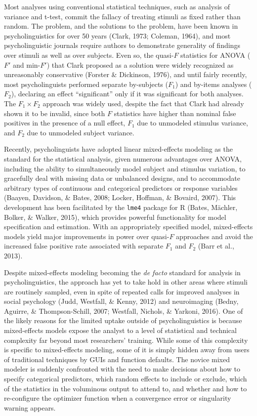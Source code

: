 \documentclass[doc,floatsintext]{apa6}
\begin{document}
Most analyses using conventional statistical techniques, such as analysis of variance and t-test, commit the fallacy of treating stimuli as fixed rather than random. The problem, and the solutions to the problem, have been known in psycholinguistics for over 50 years (Clark, 1973; Coleman, 1964), and most psycholinguistic journals require authors to demonstrate generality of findings over stimuli as well as over subjects. Even so, the quasi-\(F\) statistics for ANOVA (\(F'\) and min-\(F'\)) that Clark proposed as a solution were widely recognized as unreasonably conservative (Forster \& Dickinson, 1976), and until fairly recently, most psycholinguists performed separate by-subjects (\(F_1\)) and by-items analyses (\(F_2\)), declaring an effect \enquote{significant} only if it was significant for both analyses. The \(F_1 \times F_2\) approach was widely used, despite the fact that Clark had already shown it to be invalid, since both \(F\) statistics have higher than nominal false positives in the presence of a null effect, \(F_1\) due to unmodeled stimulus variance, and \(F_2\) due to unmodeled subject variance.

Recently, psycholinguists have adopted linear mixed-effects modeling as the standard for the statistical analysis, given numerous advantages over ANOVA, including the ability to simultaneously model subject and stimulus variation, to gracefully deal with missing data or unbalanced designs, and to accommodate arbitrary types of continuous and categorical predictors or response variables (Baayen, Davidson, \& Bates, 2008; Locker, Hoffman, \& Bovaird, 2007). This development has been facilitated by the \texttt{lme4} package for R (Bates, Mächler, Bolker, \& Walker, 2015), which provides powerful functionality for model specification and estimation. With an appropriately specified model, mixed-effects models yield major improvements in power over quasi-\(F\) approaches and avoid the increased false positive rate associated with separate \(F_1\) and \(F_2\) (Barr et al., 2013).

Despite mixed-effects modeling becoming the \emph{de facto} standard for analysis in psycholinguistics, the approach has yet to take hold in other areas where stimuli are routinely sampled, even in spite of repeated calls for improved analyses in social psychology (Judd, Westfall, \& Kenny, 2012) and neuroimaging (Bedny, Aguirre, \& Thompson-Schill, 2007; Westfall, Nichols, \& Yarkoni, 2016). One of the likely reasons for the limited uptake outside of psycholinguistics is because mixed-effects models expose the analyst to a level of statistical and technical complexity far beyond most researchers' training. While some of this complexity is specific to mixed-effects modeling, some of it is simply hidden away from users of traditional techniques by GUIs and function defaults. The novice mixed modeler is suddenly confronted with the need to make decisions about how to specify categorical predictors, which random effects to include or exclude, which of the statistics in the voluminous output to attend to, and whether and how to re-configure the optimizer function when a convergence error or singularity warning appears.
\end{document}
